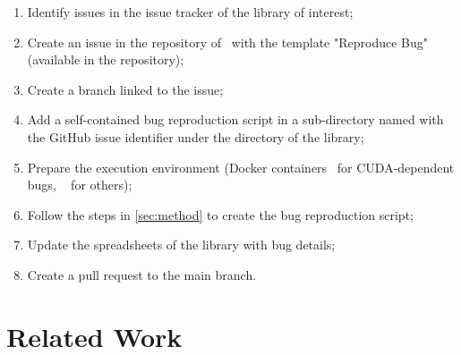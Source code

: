 \documentclass[sigconf,screen]{acmart}
\begin{document}
\begin{enumerate}[leftmargin=0.5cm]
  \item Identify issues in the issue tracker of the library of interest;
  \item Create an issue in the repository of \tname\ with the template
    "Reproduce Bug" (available in the repository);
  \item Create a branch linked to the issue;
  \item Add a self-contained bug reproduction script in a sub-directory
    named with the GitHub issue identifier under the directory of the library;
  \item Prepare the execution environment (Docker containers~\cite{merkel2014docker} for CUDA-dependent
    bugs, ~\cite{venv} for others);
  \item Follow the steps in \ref{sec:method} to create the bug reproduction script;
  \item Update the spreadsheets of the library with bug details;
  \item Create a pull request to the main branch.
\end{enumerate}




\section{Related Work} 
\end{document}
